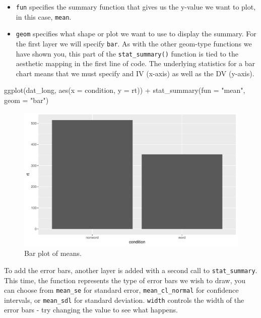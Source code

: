 \documentclass[
  english,
  doc,floatsintext]{apa6}
\newenvironment{Shaded}{\begin{snugshade}}{\end{snugshade}}
\newcommand{\AttributeTok}[1]{\textcolor[rgb]{0.77,0.63,0.00}{#1}}
\newcommand{\FunctionTok}[1]{\textcolor[rgb]{0.00,0.00,0.00}{#1}}
\newcommand{\NormalTok}[1]{#1}
\newcommand{\SpecialCharTok}[1]{\textcolor[rgb]{0.00,0.00,0.00}{#1}}
\newcommand{\StringTok}[1]{\textcolor[rgb]{0.31,0.60,0.02}{#1}}
\begin{document}
\begin{itemize}
\item
  \texttt{fun} specifies the summary function that gives us the y-value we want to plot, in this case, \texttt{mean}.
\item
  \texttt{geom} specifies what shape or plot we want to use to display the summary. For the first layer we will specify \texttt{bar}. As with the other geom-type functions we have shown you, this part of the \texttt{stat\_summary()} function is tied to the aesthetic mapping in the first line of code. The underlying statistics for a bar chart means that we must specify and IV (x-axis) as well as the DV (y-axis).
\end{itemize}

\begin{Shaded}
\begin{Highlighting}[]
\FunctionTok{ggplot}\NormalTok{(dat\_long, }\FunctionTok{aes}\NormalTok{(}\AttributeTok{x =}\NormalTok{ condition, }\AttributeTok{y =}\NormalTok{ rt)) }\SpecialCharTok{+}
  \FunctionTok{stat\_summary}\NormalTok{(}\AttributeTok{fun =} \StringTok{"mean"}\NormalTok{, }\AttributeTok{geom =} \StringTok{"bar"}\NormalTok{)}
\end{Highlighting}
\end{Shaded}

\begin{figure}

{\centering \includegraphics[width=1\linewidth]{images/badbar1-1} 

}

\caption{Bar plot of means.}\label{fig:badbar1}
\end{figure}

To add the error bars, another layer is added with a second call to \texttt{stat\_summary}. This time, the function represents the type of error bars we wish to draw, you can choose from \texttt{mean\_se} for standard error, \texttt{mean\_cl\_normal} for confidence intervals, or \texttt{mean\_sdl} for standard deviation. \texttt{width} controls the width of the error bars - try changing the value to see what happens.
\end{document}
